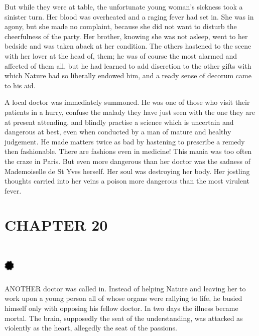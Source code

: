 \documentclass{article}
\begin{document}
\begin{center}
But while they were at table, the unfortunate young woman's sickness took a sinister 
turn. Her blood was overheated and a raging fever had set in. She was in agony, 
but she made no complaint, because she did not want to disturb the cheerfulness 
of the party. Her brother, knowing she was not asleep, went to her bedside and 
was taken aback at her condition. The others hastened to the scene with her lover 
at the head of, them; he was of course the most alarmed and affected of them all, 
but he had learned to add discretion to the other gifts with which Nature had so 
liberally endowed him, and a ready sense of decorum came to his aid. 

A local doctor was immediately summoned. He was one of those who visit their patients 
in a hurry, confuse the malady they have just seen with the one they are at present 
attending, and blindly practise a science which is uncertain and dangerous at best, 
even when conducted by a man of mature and healthy judgement. He made matters twice 
as bad by hastening to prescribe a remedy then fashionable. There are fashions 
even in medicine! This mania was too often the craze in Paris. But even more dangerous 
than her doctor was the sadness of Mademoiselle de St Yves herself. Her soul was 
destroying her body. Her jostling thoughts carried into her veins a poison more 
dangerous than the most virulent fever.\pagebreak{} 

\section*{\textbf{CHAPTER 20 }}

\section*{%
\includegraphics[width=14pt, height=15pt, keepaspectratio=true]{Zadig or L'Ingenu - Voltaire-fig042.jpg}
}

 

ANOTHER doctor was called in. Instead of helping Nature and leaving her to work 
upon a young person all of whose organs were rallying to life, he busied himself 
only with opposing his fellow doctor. In two days the illness became mortal. The 
brain, supposedly the seat of the understanding, was attacked as violently as the 
heart, allegedly the seat of the passions. 


\end{center}
\end{document}
